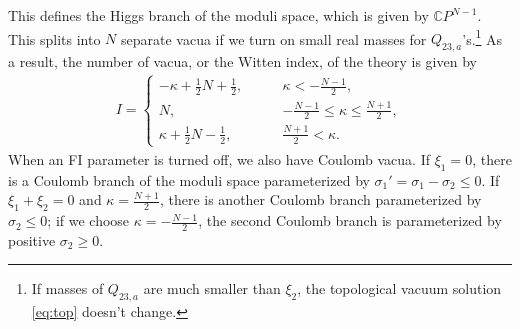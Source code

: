 \documentclass[a4paper,11pt]{article}
\begin{document}
This defines the Higgs branch of the moduli space, which is given by $\mathbb CP^{N-1}$. This splits into $N$ separate vacua if we turn on small real masses for $Q_{23,a}$'s.\footnote{If masses of $Q_{23,a}$ are much smaller than $\xi_2$, the topological vacuum solution \eqref{eq:top} doesn't change.} As a result, the number of vacua, or the Witten index, of the theory is given by
\begin{align}
I = \left\{\begin{array}{cc}
-\kappa+\frac{1}{2} N+\frac{1}{2}, \qquad & \kappa < -\frac{N-1}{2}, \\
N, \qquad & -\frac{N-1}{2} \leq \kappa \leq \frac{N+1}{2}, \\
\kappa+\frac{1}{2} N-\frac{1}{2}, \qquad & \frac{N+1}{2} < \kappa.
\end{array}\right.
\end{align}
When an FI parameter is turned off, we also have Coulomb vacua. If $\xi_1 = 0$, there is a Coulomb branch of the moduli space parameterized by $\sigma_1' = \sigma_1-\sigma_2 \leq 0$. If $\xi_1+\xi_2 = 0$ and $\kappa = \frac{N+1}{2}$, there is another Coulomb branch parameterized by $\sigma_2 \leq 0$; if we choose $\kappa = -\frac{N-1}{2}$, the second Coulomb branch is parameterized by positive $\sigma_2 \geq 0$.
\end{document}

